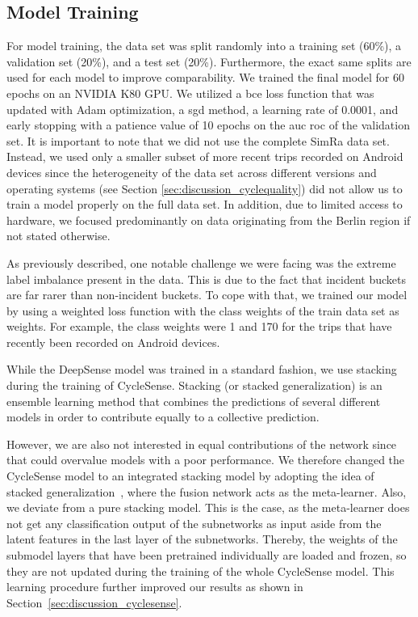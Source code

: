 \subsection{Model Training}
\label{subsec:model_training}
For model training, the data set was split randomly into a training set (60\%), a validation set (20\%), and a test set (20\%).
Furthermore, the exact same splits are used for each model to improve comparability.
We trained the final model for 60 epochs on an NVIDIA K80 GPU.
We utilized a \ac{bce} loss function that was updated with Adam optimization, a \ac{sgd} method, a learning rate of 0.0001, and early stopping with a patience value of 10 epochs on the \ac{auc} \ac{roc} of the validation set.
It is important to note that we did not use the complete SimRa data set.
Instead, we used only a smaller subset of more recent trips recorded on Android devices since the heterogeneity of the data set across different versions and operating systems (see Section \ref{sec:discussion_cyclequality}) did not allow us to train a model properly on the full data set.
In addition, due to limited access to hardware, we focused predominantly on data originating from the Berlin region if not stated otherwise.

As previously described, one notable challenge we were facing was the extreme label imbalance present in the data.
This is due to the fact that incident buckets are far rarer than non-incident buckets.
To cope with that, we trained our model by using a weighted loss function with the class weights of the train data set as weights.
For example, the class weights were 1 and 170 for the trips that have recently been recorded on Android devices.

While the DeepSense model was trained in a standard fashion, we use stacking during the training of CycleSense.
Stacking (or stacked generalization) is an ensemble learning method that combines the predictions of several different models in order to contribute equally to a collective prediction.

However, we are also not interested in equal contributions of the network since that could overvalue models with a poor performance.
We therefore changed the CycleSense model to an integrated stacking model by adopting the idea of stacked generalization~\cite{wolpert1992stacked}, where the fusion network acts as the meta-learner.
Also, we deviate from a pure stacking model.
This is the case, as the meta-learner does not get any classification output of the subnetworks as input aside from the latent features in the last layer of the subnetworks.
Thereby, the weights of the submodel layers that have been pretrained individually are loaded and frozen, so they are not updated during the training of the whole CycleSense model.
This learning procedure further improved our results as shown in Section~\ref{sec:discussion_cyclesense}.

